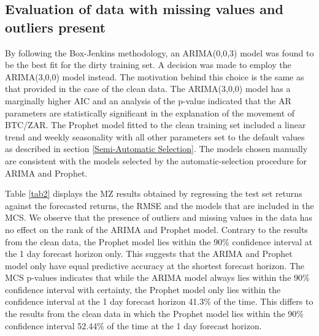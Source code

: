\documentclass[12pt,a4paper]{article}
\numberwithin{equation}{section}
\numberwithin{figure}{section}
\numberwithin{table}{section}
\begin{document}
\subsection{Evaluation of data with missing values and outliers
present}\label{evaluation-of-data-with-missing-values-and-outliers-present}

By following the Box-Jenkins methodology, an ARIMA(0,0,3) model was
found to be the best fit for the dirty training set. A decision was made
to employ the ARIMA(3,0,0) model instead. The motivation behind this
choice is the same as that provided in the case of the clean data. The
ARIMA(3,0,0) model has a marginally higher AIC and an analysis of the
p-value indicated that the AR parameters are statistically significant
in the explanation of the movement of BTC/ZAR. The Prophet model fitted
to the clean training set included a linear trend and weekly seasonality
with all other parameters set to the default values as described in
section \ref{Semi-Automatic Selection}. The models chosen manually are
consistent with the models selected by the automatic-selection procedure
for ARIMA and Prophet.

Table \ref{tab2} displays the MZ results obtained by regressing the test
set returns against the forecasted returns, the RMSE and the models that
are included in the MCS. We observe that the presence of outliers and
missing values in the data has no effect on the rank of the ARIMA and
Prophet model. Contrary to the results from the clean data, the Prophet
model lies within the 90\% confidence interval at the 1 day forecast
horizon only. This suggests that the ARIMA and Prophet model only have
equal predictive accuracy at the shortest forecast horizon. The MCS
p-values indicates that while the ARIMA model always lies within the
90\% confidence interval with certainty, the Prophet model only lies
within the confidence interval at the 1 day forecast horizon 41.3\% of
the time. This differs to the results from the clean data in which the
Prophet model lies within the 90\% confidence interval 52.44\% of the
time at the 1 day forecast horizon.
\end{document}
